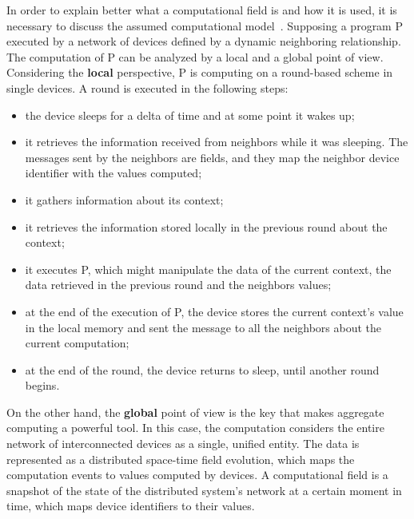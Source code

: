 In order to explain better what a computational field is and how it is used, it is necessary to discuss the assumed computational model~\cite{computational_fields_theory}.\newline
Supposing a program P executed by a network of devices defined by a dynamic neighboring relationship. The computation of P can be analyzed by a local and a global point of view.\newline
Considering the \textbf{local} perspective, P is computing on a round-based scheme in single devices. A round is executed in the following steps:
\begin{itemize}
    \item the device sleeps for a delta of time and at some point it wakes up;
    \item it retrieves the information received from neighbors while it was sleeping. The messages sent by the neighbors are fields, and they map the neighbor device identifier with the values computed;
    \item it gathers information about its context;
    \item it retrieves the information stored locally in the previous round about the context;
    \item it executes P, which might manipulate the data of the current context, the data retrieved in the previous round and the neighbors values;
    \item at the end of the execution of P, the device stores the current context's value in the local memory and sent the message to all the neighbors about the current computation;
    \item at the end of the round, the device returns to sleep, until another round begins.
\end{itemize}

On the other hand, the \textbf{global} point of view is the key that makes aggregate computing a powerful tool. In this case, the computation considers the entire network of interconnected devices as a single, unified entity.\newline
The data is represented as a distributed space-time field evolution, which maps the computation events to values computed by devices.\newline
A computational field is a snapshot of the state of the distributed system's network at a certain moment in time, which maps device identifiers to their values.

